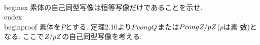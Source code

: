  \\begin{ex}
  素体の自己同型写像は恒等写像だけであることを示せ.
 \\end{ex}
 \\begin{proof}
  素体を$P$とする. 定理2.10より$P\\cong \\Q$または$P\\cong \\Z/p\\Z$($p$は素
  数)となる. ここで$\\Z/p\\Z$の自己同型写像を考える.
